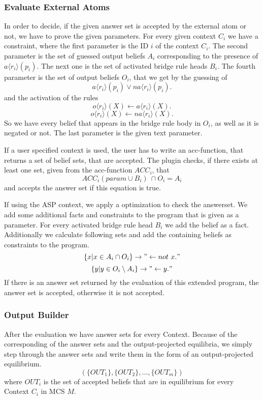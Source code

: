 \documentclass[11pt]{article}
\begin{document}
\subsubsection{Evaluate External Atoms}
In order to decide, if the given answer set is accepted by the external atom or not, we have to prove the given parameters. For every given context \(C_{i}\) we have a constraint, where the first parameter is the ID \(i\) of the context \(C_{i}\). The second parameter is the set of guessed output beliefs \(A_{i}\) corresponding to the presence of \(a\langle r_{i}\rangle(p_{i})\). The next one is the set of activated bridge rule heads \(B_{i}\). The fourth parameter is the set of output beliefs \(O_{i}\), that we get by the guessing of 
\[ a\langle r_{i}\rangle(p_{i}) \lor na\langle r_{i}\rangle(p_{i}). \] 
and the activation of the rules 
\[ o\langle r_{i}\rangle(X) \leftarrow a\langle r_{i}\rangle(X). \]
\[ o\langle r_{i}\rangle(X) \leftarrow na\langle r_{i}\rangle(X). \]
So we have every belief that appears in the bridge rule body in \(O_{i}\), as well as it is negated or not. The last parameter is the given text parameter.

If a user specified context is used, the user has to write an acc-function, that returns a set of belief sets, that are accepted. The plugin checks, if there exists at least one set, given from the acc-function \(ACC_{i}\), that 
\[ACC_{i}(param\cup B_{i})\ \cap O_{i} = A_{i} \] 
and accepts the answer set if this equation is true.

If using the ASP context, we apply a optimization to check the answerset. We add some additional facts and constraints to the program that is given as a parameter. For every activated bridge rule head \(B_{i}\) we add the belief as a fact. Additionally we calculate following sets and add the containing beliefs as constraints to the program.
\[ \{x | x \in A_{i} \cap O_{i} \} \rightarrow "\leftarrow not \ x." \]
\[ \{y | y \in O_{i} \setminus A_{i} \} \rightarrow "\leftarrow y." \]
If there is an answer set returned by the evaluation of this extended program, the answer set is accepted, otherwise it is not accepted.
\subsubsection{Output Builder}
After the evaluation we have answer sets for every Context. Because of the corresponding of the answer sets and the output-projected equilibria, we simply step through the answer sets and write them in the form of an output-projected equilibrium.
\[ (\{OUT_{1}\},\{OUT_{2}\},\ldots,\{OUT_{m}\}) \]
where \(OUT_{i}\) is the set of accepted beliefs that are in equilibrium for every Context \(C_{i}\) in MCS \(M\).
\end{document}
